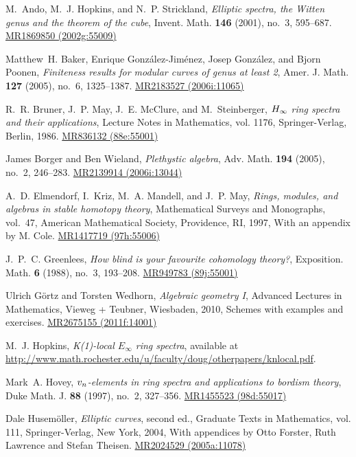 \documentclass{gtpart}
\theoremstyle{definition}
\theoremstyle{remark}
\begin{document}
\newcommand{\MRn}[2]{\href{http://www.ams.org/mathscinet-getitem?mr=#1}{MR#1 #2}}
\begin{thebibliography}

M.~Ando, M.~J. Hopkins, and N.~P. Strickland, \emph{Elliptic spectra, the
  {W}itten genus and the theorem of the cube}, Invent. Math. \textbf{146}
  (2001), no.~3, 595--687. \MRn{1869850}{(2002g:55009)}

Matthew~H. Baker, Enrique Gonz{\'a}lez-Jim{\'e}nez, Josep Gonz{\'a}lez, and
  Bjorn Poonen, \emph{Finiteness results for modular curves of genus at least
  2}, Amer. J. Math. \textbf{127} (2005), no.~6, 1325--1387. \MRn{2183527}{(2006i:11065)}

R.~R. Bruner, J.~P. May, J.~E. McClure, and M.~Steinberger, \emph{{$H\sb \infty
  $} ring spectra and their applications}, Lecture Notes in Mathematics, vol.
  1176, Springer-Verlag, Berlin, 1986. \MRn{836132}{(88e:55001)}

James Borger and Ben Wieland, \emph{Plethystic algebra}, Adv. Math.
  \textbf{194} (2005), no.~2, 246--283. \MRn{2139914}{(2006i:13044)}

A.~D. Elmendorf, I.~Kriz, M.~A. Mandell, and J.~P. May, \emph{Rings, modules,
  and algebras in stable homotopy theory}, Mathematical Surveys and Monographs,
  vol.~47, American Mathematical Society, Providence, RI, 1997, With an
  appendix by M. Cole. \MRn{1417719}{(97h:55006)}

J.~P.~C. Greenlees, \emph{How blind is your favourite cohomology theory?},
  Exposition. Math. \textbf{6} (1988), no.~3, 193--208. \MRn{949783}{(89j:55001)}

Ulrich G{\"o}rtz and Torsten Wedhorn, \emph{Algebraic geometry {I}}, Advanced
  Lectures in Mathematics, Vieweg + Teubner, Wiesbaden, 2010, Schemes with
  examples and exercises. \MRn{2675155}{(2011f:14001)}

M.~J. Hopkins, \emph{K(1)-local ${E}_\infty$ ring spectra}, available at
  \url{http://www.math.rochester.edu/u/faculty/doug/otherpapers/knlocal.pdf}.

Mark~A. Hovey, \emph{{$v\sb n$}-elements in ring spectra and applications to
  bordism theory}, Duke Math. J. \textbf{88} (1997), no.~2, 327--356.
  \MRn{1455523}{(98d:55017)}

Dale Husem{\"o}ller, \emph{Elliptic curves}, second ed., Graduate Texts in
  Mathematics, vol. 111, Springer-Verlag, New York, 2004, With appendices by
  Otto Forster, Ruth Lawrence and Stefan Theisen. \MRn{2024529}{(2005a:11078)}


\end{thebibliography}
\end{document}
